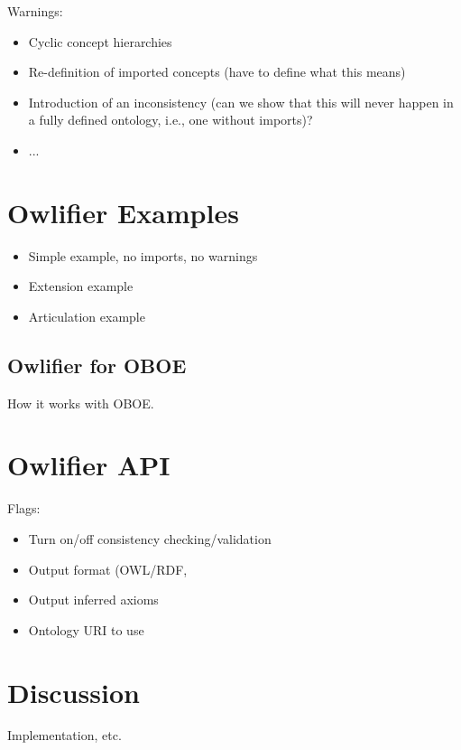 \documentclass[11pt,onecolumn]{article}
\begin{document}
Warnings: 
\begin{itemize}
\item Cyclic concept hierarchies
\item Re-definition of imported concepts (have to define what this means)
\item Introduction of an inconsistency (can we show that this will
  never happen in a fully defined ontology, i.e., one without imports)? 
\item ...
\end{itemize}

\section{\textsf{Owlifier} Examples}

\begin{itemize}
\item Simple example, no imports, no warnings
\item Extension example
\item Articulation example
\end{itemize}

\subsection{\textsf{Owlifier} for OBOE}

How it works with OBOE.


\section{\textsf{Owlifier} API}

Flags:
\begin{itemize}
\item Turn on/off consistency checking/validation
\item Output format (OWL/RDF, 
\item Output inferred axioms
\item Ontology URI to use
\end{itemize}


\section{Discussion}

Implementation, etc.




\end{document}
